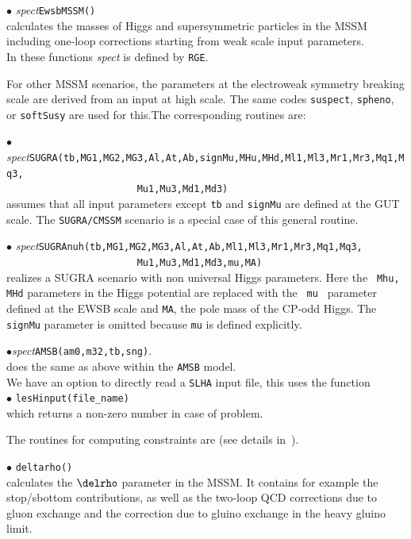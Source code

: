 \documentclass[12pt,a4paper]{article}
\begin{document}
\noindent $\bullet$ {\it spect}\verb|EwsbMSSM()|\\
 calculates the  masses of Higgs  and
supersymmetric particles in the MSSM including one-loop
corrections starting from weak scale input parameters. \\
In these functions {\it spect}  is defined by \verb|RGE|.
 

For other MSSM scenarios, the   parameters at the electroweak symmetry breaking scale are derived from 
an  input at high scale. The same codes {\tt suspect}, 
{\tt spheno}, or {\tt softSusy} are used for this.The corresponding
routines are:

\noindent $\bullet$ {\it
spect}\verb|SUGRA(tb,MG1,MG2,MG3,Al,At,Ab,signMu,MHu,MHd,Ml1,Ml3,Mr1,Mr3,Mq1,Mq3,|\\
\verb|                       Mu1,Mu3,Md1,Md3)|\\
assumes that  all input parameters except {\tt tb} and {\tt signMu}  are
defined at the GUT scale. The {\tt SUGRA/CMSSM} scenario is a special case of this general routine. 

\noindent $\bullet$ {\it
spect}\verb|SUGRAnuh(tb,MG1,MG2,MG3,Al,At,Ab,Ml1,Ml3,Mr1,Mr3,Mq1,Mq3,|\\
\verb|                       Mu1,Mu3,Md1,Md3,mu,MA)|\\
realizes a SUGRA scenario with non universal Higgs parameters. Here the {\tt
Mhu, MHd} parameters in the Higgs potential are replaced with the {\tt
mu } parameter defined at the  EWSB scale and {\tt MA}, the pole mass of the CP-odd Higgs. The
{\tt signMu} parameter is omitted  because {\tt mu} is defined
explicitly.

\noindent
$\bullet${\it spect}\verb|AMSB(am0,m32,tb,sng)|.\\
does  the same as above within the {\tt AMSB} model.\\

We  have an option to directly read a {\tt SLHA}  input file, this uses the  function \\
\noi$\bullet$ \verb|lesHinput(file_name) |\\
which returns a non-zero number in case of problem.

The routines for computing constraints are (see details
in~\cite{Belanger:2004yn}).

\noi$\bullet$ \verb|deltarho()|\\
 calculates  the $\delrho$ parameter in the MSSM.  It contains for example the 
stop/sbottom contributions, as well as the two-loop QCD
corrections due to gluon exchange and the correction due to gluino
exchange in the heavy gluino limit.
\end{document}
